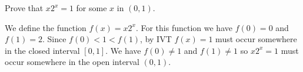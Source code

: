 
Prove that $x2^x=1$ for some $x$ in $(0,1)$.

\medskip

We define the function $f(x)=x2^x$.
For this function we have $f(0)=0$ and $f(1)=2$.
Since $f(0)<1<f(1)$, by IVT $f(x)=1$ must occur somewhere in the
closed interval $[0,1]$.
We have $f(0)\ne1$ and $f(1)\ne1$ so $x2^x=1$ must occur somewhere in the
open interval $(0,1)$.


